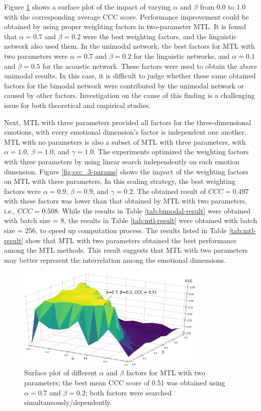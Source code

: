 Figure \ref{fig:ccc_2-params} shows a surface plot of the impact of varying
$\alpha$ and $\beta$ from 0.0 to 1.0 with the corresponding average CCC score.
Performance improvement could be obtained by using proper weighting factors in
two-parameter MTL. It is found that $\alpha=0.7$ and $\beta=0.2$ were the best
weighting factors, and the linguistic network also used them.  In the unimodal
network, the best factors for MTL with two parameters were $\alpha=0.7$ and
$\beta=0.2$ for the linguistic networks, and $\alpha=0.1$ and $\beta=0.5$ for
the acoustic network. These factors were used to obtain the above unimodal results. In this case, it is difficult to judge whether these same obtained
factors for the bimodal network were contributed by the unimodal network or
caused by other factors.  Investigation on the cause of this finding is a
challenging issue for both theoretical and empirical studies.

Next, MTL with three parameters provided all factors for the three-dimensional
emotions, with every emotional dimension's factor is independent one another. 
MTL with no parameters is also a subset of MTL with three parameters,
with $\alpha=1.0$, $\beta=1.0$, and $\gamma=1.0$. The experiments optimized the
weighting factors with three parameters by using linear search independently on
each emotion dimension. Figure \ref{fig:ccc_3-params} shows the impact of the
weighting factors on MTL with three parameters. In this scaling strategy, the
best weighting factors were $\alpha=0.9$, $\beta=0.9$, and $\gamma=0.2$. The
obtained result of $CCC=0.497$ with these factors was lower than that obtained
by MTL with two parameters, i.e., $CCC=0.508$. While the results in Table
\ref{tab:bimodal-result} were obtained with batch size = 8, the results in
Table \ref{tab:mtl-result} were obtained with batch size = 256, to speed up
computation process. The results listed in Table \ref{tab:mtl-result} show that
MTL with two parameters obtained the best performance among the MTL methods.
This result suggests that MTL with two parameters may better represent the
interrelation among the emotional dimensions. 

\begin{figure}[htpb]
  \begin{center}
  \includegraphics[width=0.8\textwidth]{../fig/alpha_beta.pdf}
  \end{center}
  \caption{Surface plot of different $\alpha$ and $\beta$ factors for MTL with two parameters; the best mean CCC score of 0.51 was obtained using $\alpha=0.7$ and $\beta=0.2$; both factors were searched simultaneously/dependently.}
  \label{fig:ccc_2-params}
\end{figure}

